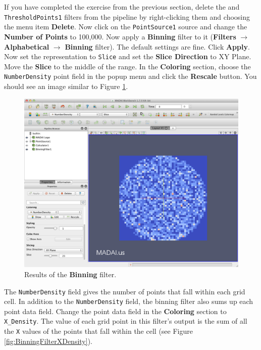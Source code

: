 \documentclass[12pt]{article}
\newcommand{\filter}[1]{\textbf{#1}}
\newcommand{\filterinstance}[1]{\texttt{#1}}
\newcommand{\menu}[1]{\textbf{#1}}
\newcommand{\representation}[1]{\texttt{#1}}
\newcommand{\setting}[1]{\textbf{#1}}
\newcommand{\field}[1]{\texttt{#1}}
\begin{document}
If you have completed the exercise from the previous section, delete the and \filterinstance{ThresholdPoints1} filters from the pipeline by right-clicking them and choosing the menu item \menu{Delete}. Now click on the \filterinstance{PointSource1} source and change the \setting{Number of Points} to 100,000. Now apply a \filter{Binning} filter to it (\menu{Filters} $\rightarrow$ \menu{Alphabetical} $\rightarrow$ \menu{Binning} filter). The default settings are fine. Click \setting{Apply}. Now set the representation to \representation{Slice} and set the \setting{Slice Direction} to XY Plane. Move the \setting{Slice} to the middle of the range. In the \setting{Coloring} section, choose the \field{NumberDensity} point field in the popup menu and click the \setting{Rescale} button. You should see an image similar to Figure \ref{fig:BinningFilter}.

\begin{figure}[htbp]
   \centering
   \includegraphics[scale=.25]{images/BinningFilter.png} %
   \caption{Results of the \filter{Binning} filter.}
   \label{fig:BinningFilter}
\end{figure}

The \field{NumberDensity} field gives the number of points that fall within each grid cell. In addition to the \field{NumberDensity} field, the binning filter also sums up each point data field. Change the point data field in the \setting{Coloring} section to \field{X\_Density}. The value of each grid point in this filter's output is the sum of all the \field{X} values of the points that fall within the cell (see Figure \ref{fig:BinningFilterXDensity}).
\end{document}
